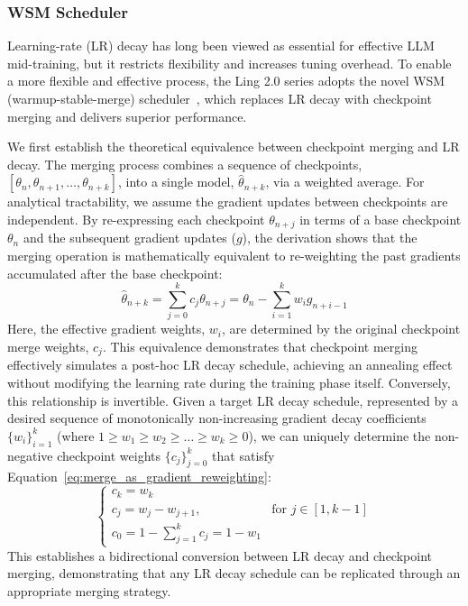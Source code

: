 \subsubsection{WSM Scheduler}
\label{sec:merging}
Learning-rate (LR) decay has long been viewed as essential for effective LLM mid-training, but it restricts flexibility and increases tuning overhead. To enable a more flexible and effective process, the Ling 2.0 series adopts the novel WSM (warmup-stable-merge) scheduler~\citep{tian2025wsmdecayfreelearningrate}, which replaces LR decay with checkpoint merging and delivers superior performance. 

We first establish the theoretical equivalence between checkpoint merging and LR decay. The merging process combines a sequence of checkpoints, $[\theta_n, \theta_{n+1}, \dots, \theta_{n+k}]$, into a single model, $\hat{\theta}_{n+k}$, via a weighted average. For analytical tractability, we assume the gradient updates between checkpoints are independent. By re-expressing each checkpoint $\theta_{n+j}$ in terms of a base checkpoint $\theta_n$ and the subsequent gradient updates ($g$), the derivation shows that the merging operation is mathematically equivalent to re-weighting the past gradients accumulated after the base checkpoint:
\begin{equation}
\label{eq:merge_as_gradient_reweighting}
    \hat{\theta}_{n+k} = \sum_{j=0}^{k} c_j \theta_{n+j} = \theta_n - \sum_{i=1}^{k} w_i g_{n+i-1}
\end{equation}
Here, the effective gradient weights, $w_i$, are determined by the original checkpoint merge weights, $c_j$. This equivalence demonstrates that checkpoint merging effectively simulates a post-hoc LR decay schedule, achieving an annealing effect without modifying the learning rate during the training phase itself.
Conversely, this relationship is invertible. Given a target LR decay schedule, represented by a desired sequence of monotonically non-increasing gradient decay coefficients $\{w_i\}_{i=1}^k$ (where $1 \ge w_1 \ge w_2 \ge \dots \ge w_k \ge 0$), we can uniquely determine the non-negative checkpoint weights $\{c_j\}_{j=0}^k$ that satisfy Equation~\ref{eq:merge_as_gradient_reweighting}:
\begin{equation}
\begin{cases}
    c_k = w_k \\
    c_j = w_j - w_{j+1}, & \text{for } j \in [1, k-1] \\
    c_0 = 1 - \sum_{j=1}^{k} c_j = 1 - w_1
\end{cases}
\label{eq:inverse_formula}
\end{equation}
This establishes a bidirectional conversion between LR decay and checkpoint merging, demonstrating that any LR decay schedule can be replicated through an appropriate merging strategy. 

